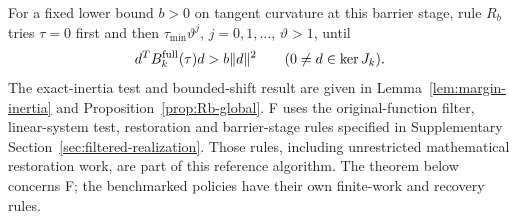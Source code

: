 \documentclass[pdflatex,sn-mathphys-num]{sn-jnl}
\theoremstyle{thmstyleone}
\theoremstyle{thmstylethree}
\newcounter{algorithm}
\begin{document}
For a fixed lower bound $b>0$ on tangent curvature at this barrier stage,
rule $R_b$ tries $\tau=0$ first and
then $\tau_{\min}\vartheta^j$, $j=0,1,\ldots$, $\vartheta>1$, until
\[
 d^TB_k^{\rm full}(\tau)d>b\|d\|^2
       \qquad(0\ne d\in\ker J_k).
\]
The exact-inertia test and bounded-shift result are given in
Lemma~\ref{lem:margin-inertia} and Proposition~\ref{prop:Rb-global}.
F uses the original-function filter, linear-system test, restoration and barrier-stage
rules specified in Supplementary Section~\ref{sec:filtered-realization}.
Those rules, including unrestricted mathematical restoration work, are
part of this reference algorithm. The theorem below concerns F;
the benchmarked policies have their own finite-work and recovery rules.
\end{document}
